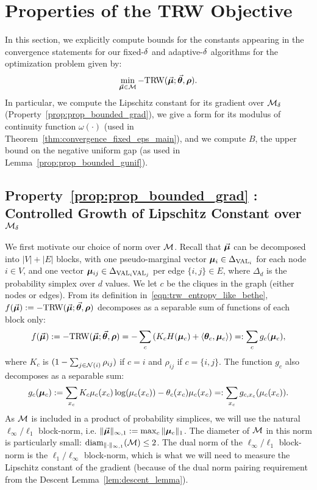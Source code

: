 \section{Properties of the TRW Objective \label{sec:trw_properties}}
In this section, we explicitly compute bounds for the constants appearing in the convergence statements for our fixed-$\delta$ and adaptive-$\delta$ algorithms for the optimization problem given by:
$$\min_{\vec{\bm{\mu}}\in\mathcal{M}}-\text{TRW}(\vec{\bm{\mu}};\vec{\bm{\theta}},\bm{\rho}).$$ 
In particular, we compute the Lipschitz constant for its gradient over $\mathcal{M}_{\delta}$ (Property~\ref{prop:prop_bounded_grad}), we give a form for its modulus of continuity function $\omega(\cdot)$ (used in Theorem~\ref{thm:convergence_fixed_eps_main}), and we compute $B$, the upper bound on the negative uniform gap (as used in Lemma~\ref{prop:prop_bounded_gunif}).

\subsection{Property~\ref{prop:prop_bounded_grad} : Controlled Growth of Lipschitz Constant over $\mathcal{M}_{\delta}$} \label{sec:trw_bounded_lip}
%
%

We first motivate our choice of norm over $\mathcal{M}$. Recall that $\vec{\bm{\mu}}$ can be decomposed into $|V| + |E|$ blocks, with one pseudo-marginal vector $\bm{\mu}_i \in \Delta_{\textrm{VAL}_i}$ for each node $i \in V$, and one vector $\bm{\mu}_{ij} \in \Delta_{\textrm{VAL}_i \textrm{VAL}_j}$ per edge $\{i,j\} \in E$, where $\Delta_d$ is the probability simplex over $d$ values.
We let $c$ be the cliques in the graph (either nodes or edges). From its definition in~\eqref{eqn:trw_entropy_like_bethe}, $f(\vec{\bm{\mu}}) := -\text{TRW}(\vec{\bm{\mu}};\vec{\bm{\theta}},\bm{\rho})$ decomposes as a separable sum of functions of each block only:
	\begin{equation} \label{eq:TRW_decompsed}
	f(\vec{\bm{\mu}}) := -\text{TRW}(\vec{\bm{\mu}};\vec{\bm{\theta}},\bm{\rho}) = -\sum_c \left(K_c H(\bm{\mu}_c) +\left\langle \bm{\theta}_c , \bm{\mu}_c \right\rangle\right) =: \sum_c g_c(\bm{\mu}_c),
	\end{equation}
where $K_c$ is $(1- \sum_{j \in \mathcal{N}(i)} \rho_{ij})$ if $c = i$ and $\rho_{ij}$ if $c = \{i,j\}$. The function $g_c$ also decomposes as a separable sum: 
\begin{equation} \label{eq:gc_function}
g_c(\bm{\mu}_c) := \sum_{x_c} K_c \mu_c(x_c) \log (\mu_c(x_c)) - \theta_c(x_c) \mu_c(x_c) =: \sum_{x_c} g_{c,x_c} (\mu_c(x_c)). 
\end{equation}
As $\mathcal{M}$ is included in a product of probability simplices, we will use the natural $\ell_\infty/\ell_1$ block-norm, i.e. $\| \vec{\bm{\mu}} \|_{\infty,1} := \max_{c} \|\bm{\mu}_c \|_1$. The diameter of $\mathcal{M}$ in this norm is particularly small: $\operatorname{diam}_{\|\cdot \|_{\infty,1}}(\mathcal{M}) \leq 2$. The dual norm of the $\ell_\infty/\ell_1$ block-norm is the $\ell_1/\ell_\infty$ block-norm, which is what we will need to measure the Lipschitz constant of the gradient (because of the dual norm pairing requirement from the Descent Lemma~\ref{lem:descent_lemma}).


